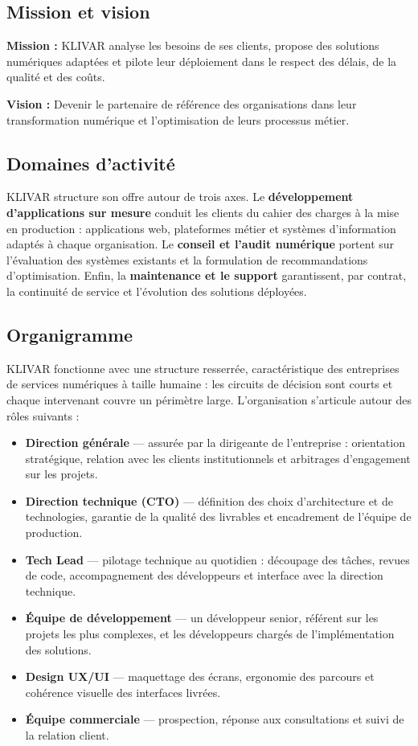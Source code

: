 \subsection{Mission et vision}

\textbf{Mission :} KLIVAR analyse les besoins de ses clients, propose des solutions numériques adaptées et pilote leur déploiement dans le respect des délais, de la qualité et des coûts.

\textbf{Vision :} Devenir le partenaire de référence des organisations dans leur transformation numérique et l'optimisation de leurs processus métier.

\subsection{Domaines d'activité}

KLIVAR structure son offre autour de trois axes. Le \textbf{développement d'applications sur mesure} conduit les clients du cahier des charges à la mise en production : applications web, plateformes métier et systèmes d'information adaptés à chaque organisation. Le \textbf{conseil et l'audit numérique} portent sur l'évaluation des systèmes existants et la formulation de recommandations d'optimisation. Enfin, la \textbf{maintenance et le support} garantissent, par contrat, la continuité de service et l'évolution des solutions déployées.

\subsection{Organigramme}

KLIVAR fonctionne avec une structure resserrée, caractéristique des entreprises de services numériques à taille humaine : les circuits de décision sont courts et chaque intervenant couvre un périmètre large. L'organisation s'articule autour des rôles suivants :

\begin{itemize}
    \item \textbf{Direction générale} — assurée par la dirigeante de l'entreprise : orientation stratégique, relation avec les clients institutionnels et arbitrages d'engagement sur les projets.
    \item \textbf{Direction technique (CTO)} — définition des choix d'architecture et de technologies, garantie de la qualité des livrables et encadrement de l'équipe de production.
    \item \textbf{Tech Lead} — pilotage technique au quotidien : découpage des tâches, revues de code, accompagnement des développeurs et interface avec la direction technique.
    \item \textbf{Équipe de développement} — un développeur senior, référent sur les projets les plus complexes, et les développeurs chargés de l'implémentation des solutions.
    \item \textbf{Design UX/UI} — maquettage des écrans, ergonomie des parcours et cohérence visuelle des interfaces livrées.
    \item \textbf{Équipe commerciale} — prospection, réponse aux consultations et suivi de la relation client.
\end{itemize}

